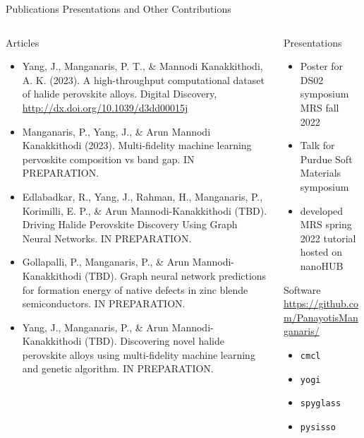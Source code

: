 \documentclass[10pt, aspectratio=169, presentation]{beamer}
\renewcommand{\footnotesize}{\fontfamily{phv}\selectfont\scriptsize}
\begin{document}
\begin{frame}[label={sec:org46a7e04},fragile]{Publications Presentations and Other Contributions}
 \begin{columns}
\begin{column}{0.66\columnwidth}
\begin{block}{Articles}
\footnotesize
\begin{itemize}
\item Yang, J., Manganaris, P. T., \& Mannodi Kanakkithodi, A. K. (2023). A high-throughput computational dataset of halide perovskite alloys. Digital Discovery, \url{http://dx.doi.org/10.1039/d3dd00015j}
\item Manganaris, P., Yang, J., \& Arun Mannodi Kanakkithodi (2023). Multi-fidelity machine learning pervoskite composition vs band gap. IN PREPARATION.
\item Edlabadkar, R., Yang, J., Rahman, H., Manganaris, P., Korimilli, E. P., \& Arun Mannodi-Kanakkithodi (TBD). Driving Halide Perovskite Discovery Using Graph Neural Networks. IN PREPARATION.
\item Gollapalli, P., Manganaris, P., \& Arun Mannodi-Kanakkithodi (TBD). Graph neural network predictions for formation energy of native defects in zinc blende semiconductors. IN PREPARATION.
\item Yang, J., Manganaris, P., \& Arun Mannodi-Kanakkithodi (TBD). Discovering novel halide perovskite alloys using multi-fidelity machine learning and genetic algorithm. IN PREPARATION.
\end{itemize}
\end{block}
\end{column}
\begin{column}{0.33\columnwidth}
\begin{block}{Presentations}
\footnotesize
\begin{itemize}
\item Poster for DS02 symposium MRS fall 2022
\item Talk for Purdue Soft Materials symposium
\item developed MRS spring 2022 tutorial hosted on nanoHUB
\end{itemize}
\end{block}
\begin{block}{Software}
\footnotesize
\url{https://github.com/PanayotisManganaris/}
\begin{itemize}
\item \texttt{cmcl}
\item \texttt{yogi}
\item \texttt{spyglass}
\item \texttt{pysisso}
\end{itemize}
\end{block}
\end{column}
\end{columns}
\end{frame}
\end{document}
